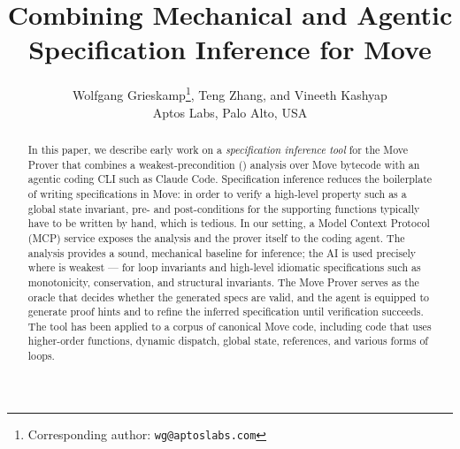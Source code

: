 \documentclass{article}
\begin{document}
\title{Combining Mechanical and Agentic\\ Specification Inference for Move}

\author{%
	Wolfgang Grieskamp\thanks{Corresponding author: \texttt{wg@aptoslabs.com}},
	Teng Zhang, and Vineeth Kashyap \\
	Aptos Labs, Palo Alto, USA
}

\maketitle

\begin{abstract}
	In this paper, we describe early work on a \emph{specification inference tool} for the Move Prover that combines a weakest-precondition (\WP) analysis over Move bytecode with an agentic coding CLI such as Claude Code.
	Specification inference reduces the boilerplate of writing specifications in Move: in order to verify a high-level property such as a global state invariant, pre- and post-conditions for the supporting functions typically have to be written by hand, which is tedious.
	In our setting, a Model Context Protocol (MCP) service exposes the \WP analysis and the prover itself to the coding agent.
	The \WP analysis provides a sound, mechanical baseline for inference; the AI is used precisely where \WP is weakest --- for loop invariants and high-level idiomatic specifications such as monotonicity, conservation, and structural invariants.
	The Move Prover serves as the oracle that decides whether the generated specs are valid, and the agent is equipped to generate proof hints and to refine the inferred specification until verification succeeds.
	The tool has been applied to a corpus of canonical Move code, including code that uses higher-order functions, dynamic dispatch, global state, references, and various forms of loops.
\end{abstract}








\end{document}
